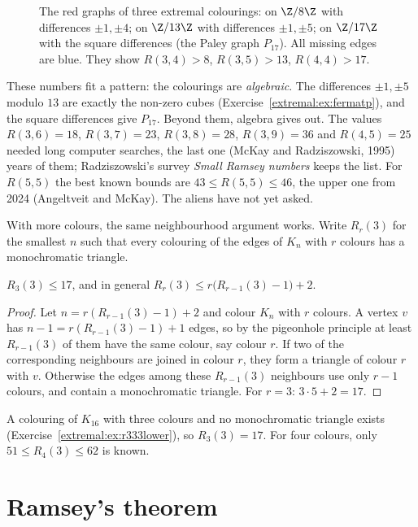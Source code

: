\begin{figure}[ht]
\centering
{}
\caption{The red graphs of three extremal colourings: on $\Z/8\Z$ with differences $\pm1,\pm4$; on $\Z/13\Z$ with differences $\pm1,\pm5$; on $\Z/17\Z$ with the square
differences (the Paley graph $P_{17}$). All missing edges are blue. They show $R(3,4)>8$, $R(3,5)>13$, $R(4,4)>17$.}
\label{extremal:fig:circulants}
\end{figure}

\begin{remark}
These numbers fit a pattern: the colourings are \emph{algebraic}. The differences $\pm1,\pm5$ modulo $13$ are exactly the non-zero cubes (Exercise~\ref{extremal:ex:fermatp}), and the
square differences give $P_{17}$. Beyond them, algebra gives out. The values $R(3,6)=18$, $R(3,7)=23$, $R(3,8)=28$, $R(3,9)=36$ and $R(4,5)=25$ needed long computer
searches, the last one (McKay and Radziszowski, 1995) years of them; Radziszowski's survey \emph{Small Ramsey numbers} keeps the list. For $R(5,5)$ the best
known bounds are $43\le R(5,5)\le46$, the upper one from 2024 (Angeltveit and McKay). The aliens have not yet asked.
\end{remark}

With more colours, the same neighbourhood argument works. Write $R_r(3)$ for the smallest $n$ such that every colouring of the edges of $K_n$ with $r$ colours has a monochromatic
triangle.

\begin{proposition}\label{extremal:prop:r333}
$R_3(3)\le17$, and in general $R_r(3)\le r\bigl(R_{r-1}(3)-1\bigr)+2$.
\end{proposition}
\begin{proof}
Let $n=r(R_{r-1}(3)-1)+2$ and colour $K_n$ with $r$ colours. A vertex $v$ has $n-1=r(R_{r-1}(3)-1)+1$ edges, so by the pigeonhole principle at least $R_{r-1}(3)$ of them
have the same colour, say colour $r$. If two of the corresponding neighbours are joined in colour $r$, they form a triangle of colour $r$ with $v$. Otherwise the
edges among these $R_{r-1}(3)$ neighbours use only $r-1$ colours, and contain a monochromatic triangle. For $r=3$: $3\cdot5+2=17$.
\end{proof}

A colouring of $K_{16}$ with three colours and no monochromatic triangle exists (Exercise~\ref{extremal:ex:r333lower}), so $R_3(3)=17$. For four colours, only
$51\le R_4(3)\le62$ is known.

\section{Ramsey's theorem}

